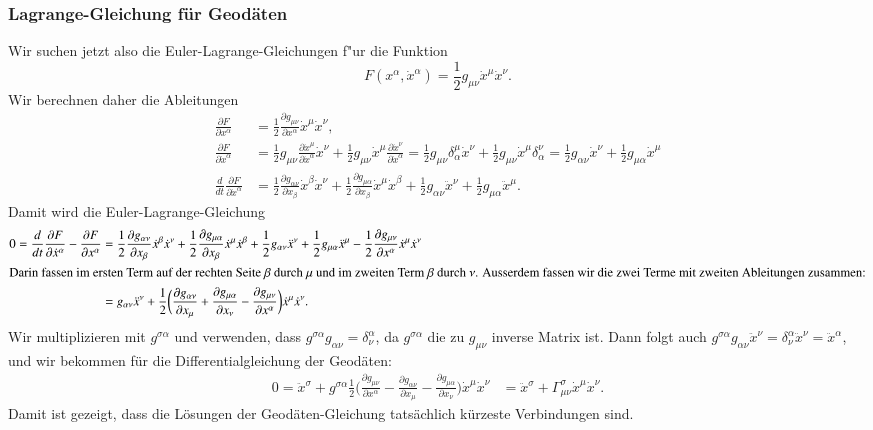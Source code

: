 \subsubsection{Lagrange-Gleichung für Geodäten}
Wir suchen jetzt also die Euler-Lagrange-Gleichungen f"ur die Funktion
\[
F(x^\alpha, \dot x^\alpha) = \frac12 g_{\mu\nu} \dot x^\mu \dot x^\nu.
\]
Wir berechnen daher die Ableitungen
\begin{align*}
\frac{\partial F}{\partial x^\alpha}
&=
\frac12\frac{\partial g_{\mu\nu}}{\partial x^\alpha} \dot x^\mu \dot x^\nu,
\\
\frac{\partial F}{\partial \dot x^\alpha}
&=
\frac12 g_{\mu\nu}\frac{\partial \dot x^\mu}{\partial \dot x^\alpha}\dot x^\nu
+
\frac12 g_{\mu\nu}\dot x^\mu \frac{\partial \dot x^\nu}{\partial \dot x^\alpha}
=
\frac12 g_{\mu\nu}\delta^\mu_\alpha \dot x^\nu
+
\frac12 g_{\mu\nu}\dot x^\mu \delta^\nu_\alpha 
=
\frac12 g_{\alpha\nu}\dot x^\nu
+
\frac12 g_{\mu\alpha}\dot x^\mu 
\\
\frac{d}{dt}\frac{\partial F}{\partial \dot x^\alpha}
&=
\frac12\frac{\partial g_{\alpha\nu}}{\partial x_{\beta}}\dot x^\beta\dot x^\nu
+
\frac12\frac{\partial g_{\mu\alpha}}{\partial x_{\beta}}\dot x^\mu\dot x^\beta
+
\frac12g_{\alpha\nu}\ddot x^\nu
+
\frac12g_{\mu\alpha}\ddot x^\mu.
\end{align*}
Damit wird die Euler-Lagrange-Gleichung
\begin{align*}
0=
\frac{d}{dt}\frac{\partial F}{\partial \dot x^\alpha}
-
\frac{\partial F}{\partial x^\alpha}
&=
\frac12
\frac{\partial g_{\alpha\nu}}{\partial x_{\beta}}\dot x^\beta\dot x^\nu
+
\frac12
\frac{\partial g_{\mu\alpha}}{\partial x_{\beta}}\dot x^\mu\dot x^\beta
+
\frac12
g_{\alpha\nu}\ddot x^\nu
+
\frac12
g_{\mu\alpha}\ddot x^\mu
-
\frac12\frac{\partial g_{\mu\nu}}{\partial x^\alpha} \dot x^\mu \dot x^\nu
\\
\intertext{Darin fassen im ersten Term auf der rechten Seite
$\beta$ durch $\mu$ und im zweiten Term $\beta$ durch $\nu$.
Ausserdem fassen wir die zwei Terme mit zweiten Ableitungen zusammen:}
&=
g_{\alpha\nu}\ddot x^\nu
+
\frac12
\biggl(
\frac{\partial g_{\alpha\nu}}{\partial x_\mu}
+
\frac{\partial g_{\mu\alpha}}{\partial x_\nu}
-
\frac{\partial g_{\mu\nu}}{\partial x^\alpha}
\biggr)\dot x^\mu\dot x^\nu.
\end{align*}
Wir multiplizieren mit $g^{\sigma\alpha}$ und verwenden,
dass $g^{\sigma\alpha}g_{\alpha\nu} = \delta_\nu^\alpha$, da $g^{\sigma\alpha}$
die zu $g_{\mu\nu}$ inverse Matrix ist.
Dann folgt auch
$g^{\sigma\alpha}g_{\alpha\nu}\ddot x^\nu
=
\delta_\nu^\alpha\ddot x^\nu
=
\ddot x^\alpha$, und
wir bekommen für die Differentialgleichung der Geodäten:
\begin{align*}
0=
\ddot x^\sigma
+
g^{\sigma\alpha}\frac12\biggl(
\frac{\partial g_{\mu\nu}}{\partial x^\alpha}
-
\frac{\partial g_{\alpha\nu}}{\partial x_{\mu}}
-
\frac{\partial g_{\mu\alpha}}{\partial x_{\nu}}
\biggr)
\dot x^\mu\dot x^\nu
&=
\ddot x^\sigma
+
\Gamma_{\mu\nu}^\sigma \dot x^\mu\dot x^\nu.
\end{align*}
Damit ist gezeigt, dass die Lösungen der Geodäten-Gleichung tatsächlich
kürzeste Verbindungen sind.



